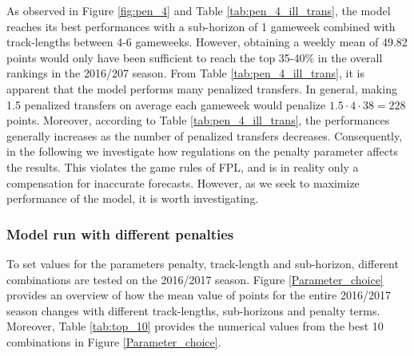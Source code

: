 As observed in Figure \ref{fig:pen_4} and Table \ref{tab:pen_4_ill_trans}, the model reaches its best performances with a sub-horizon of 1 gameweek combined with track-lengths between 4-6 gameweeks. However, obtaining a weekly mean of 49.82 points would only have been sufficient to reach the top 35-40\% in the overall rankings in the 2016/207 season. From Table \ref{tab:pen_4_ill_trans}, it is apparent that the model performs many penalized transfers. In general, making 1.5 penalized transfers on average each gameweek would penalize $1.5\cdot4\cdot38 = 228$ points. Moreover, according to Table \ref{tab:pen_4_ill_trans}, the performances generally increases as the number of penalized transfers decreases. Consequently, in the following we investigate how regulations on the penalty parameter affects the results. This violates the game rules of FPL, and is in reality only a compensation for inaccurate forecasts. However, as we seek to maximize performance of the model, it is worth investigating. 


\subsubsection{Model run with different penalties}

To set values for the parameters penalty, track-length and sub-horizon, different combinations are tested on the 2016/2017 season. Figure \ref{Parameter_choice} provides an overview of how the mean value of points for the entire 2016/2017 season changes with different track-lengths, sub-horizons and penalty terms. Moreover, Table \ref{tab:top_10} provides the numerical values from the best 10 combinations in Figure \ref{Parameter_choice}.


\newpar

